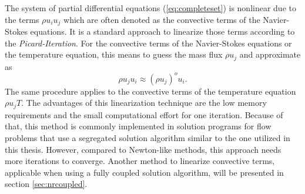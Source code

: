 The system of partial differential equations (\ref{eq:completeset}) is nonlinear due to the terms \(\rho u_i u_j\) which are often denoted as the convective terms of the Navier-Stokes equations. It is a standard approach to linearize those terms according to the \emph{Picard-Iteration}. For the convective terms of the Navier-Stokes equations or the temperature equation, this means to guess the mass flux \( \rho u_j\) and approximate as
\begin{displaymath}
  \rho u_j u_i \approx \left( \rho u_j \right)^o u_i.
\end{displaymath}
The same procedure applies to the convective terms of the temperature equation \(\rho u_j T\). The advantages of this linearization technique are the low memory requirements and the small computational effort for one iteration. Because of that, this method is commonly implemented in solution programs for flow problems that use a segregated solution algorithm similar to the one utilized in this thesis. However, compared to Newton-like methods, this approach needs more iterations to converge. Another method to linearize convective terms, applicable when using a fully coupled solution algorithm, will be presented in section \ref{sec:nrcoupled}.
